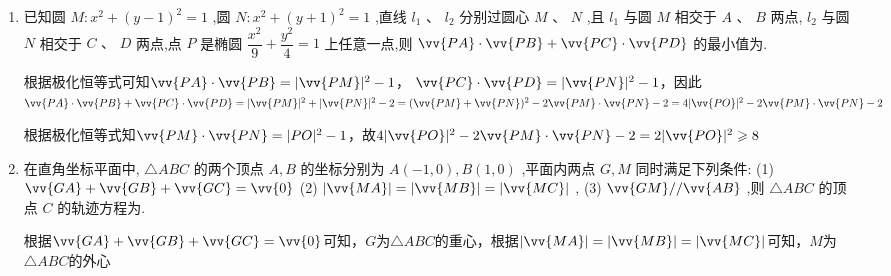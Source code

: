 \begin{enumerate}
\begin{jieda}
        $A$与$P$关于原点中心对称，则$k_{PA} = \sqrt{2}$，故$k_{PB} = -\sqrt{2}$，根据椭圆的第三定义可知$k_{AB} \cdot k_{PB} = \dfrac{1}{e^2 - 1} = -2$，故$k_{AB} = \sqrt{2}$

        正常求解：
        
        根据题意设 $A\left( {{x}_{1},{y}_{1}}\right) ,B\left( {{x}_{2},{y}_{2}}\right)$
        
        直线 ${PA}$ 的直线方程为 $y - \sqrt{2} = k\left( {x - 1}\right)$ ,代入方程 $\dfrac{{x}^{2}}{2} + \dfrac{{y}^{2}}{4} = 1$，消去$y$整理得$\left( {{k}^{2} + 2}\right) {x}^{2} - {2k}\left( {k - \sqrt{2}}\right) x + {k}^{2} - 2\sqrt{2}k - 2 = 0$，根据韦达定理有 ${x}_{1} \times  1 = \dfrac{{k}^{2} - 2\sqrt{2}k - 2}{{k}^{2} + 2}$，故 ${x}_{1} = \dfrac{{k}^{2} - 2\sqrt{2}k - 2}{{k}^{2} + 2},{y}_{1} = \dfrac{-\sqrt{2}{k}^{2} - {4k} + 2\sqrt{2}}{{k}^{2} + 2}$
        
        因为直线 ${PA}$ 、 ${PB}$ 的倾斜角互补，所以用 $- k$ 代替 ${x}_{1},{y}_{1}$ 中的 $k$，得 ${x}_{2} = \dfrac{{k}^{2} + 2\sqrt{2}k - 2}{{k}^{2} + 2},{y}_{2} = \dfrac{-\sqrt{2}{k}^{2} + {4k} + 2\sqrt{2}}{{k}^{2} + 2}$
        
        所以 ${k}_{AB} = \dfrac{{y}_{2} - {y}_{1}}{{x}_{2} - {x}_{1}} = \sqrt{2}$ 
    \end{jieda}

    \item 已知圆 $M : {x}^{2} + {\left( y - 1\right) }^{2} = 1$ ,圆 $N : {x}^{2} + {\left( y + 1\right) }^{2} = 1$ ,直线 ${l}_{1}\text{ 、 }{l}_{2}$ 分别过圆心 $M\text{ 、 }N$ ,且 ${l}_{1}$ 与圆 $M$ 相交于 $A$ 、 $B$ 两点, ${l}_{2}$ 与圆 $N$ 相交于 $C\text{ 、 }D$ 两点,点 $P$ 是椭圆 $\dfrac{{x}^{2}}{9} + \dfrac{{y}^{2}}{4} = 1$ 上任意一点,则 $\vv{PA} \cdot  \vv{PB} + \vv{PC} \cdot  \vv{PD}$ 的最小值为.
    \begin{jieda}
        根据极化恒等式可知$\vv{PA} \cdot \vv{PB} = |\vv{PM}|^2 - 1$， $\vv{PC} \cdot \vv{PD} = |\vv{PN}|^2 - 1$，因此$\vv{PA} \cdot  \vv{PB} + \vv{PC} \cdot  \vv{PD} = |\vv{PM}|^2 + |\vv{PN}|^2 - 2 = (\vv{PM} + \vv{PN})^2 - 2\vv{PM} \cdot \vv{PN} - 2 = 4|\vv{PO}|^2 - 2\vv{PM} \cdot \vv{PN} - 2$

        根据极化恒等式知$\vv{PM} \cdot \vv{PN} = |PO|^2 - 1$，故$4|\vv{PO}|^2 - 2\vv{PM} \cdot \vv{PN} - 2 = 2|\vv{PO}|^2 \geq 8$    
    \end{jieda}
    \item 在直角坐标平面中, $\bigtriangleup {ABC}$ 的两个顶点 $A,B$ 的坐标分别为 $A\left( {-1,0}\right) ,B\left( {1,0}\right)$ ,平面内两点 $G,M$ 同时满足下列条件: (1) $\vv{GA} + \vv{GB} + \vv{GC} = \vv{0}$ (2) $ \left| \vv{MA}\right|  = \left| \vv{MB}\right|  = \left| \vv{MC}\right|$ , (3) $\vv{GM}//\vv{AB}$ ,则 $\bigtriangleup  {ABC}$ 的顶点 $C$ 的轨迹方程为.
    \begin{jieda}
        根据$\vv{GA} + \vv{GB} + \vv{GC} = \vv{0}$可知，$G$为$\triangle ABC$的重心，根据$\left| \vv{MA}\right|  = \left| \vv{MB}\right|  = \left| \vv{MC}\right|$可知，$M$为$\triangle ABC$的外心


\end{jieda}
\end{enumerate}

